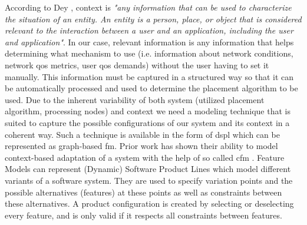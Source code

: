 According to Dey \cite{Dey2001}, context is \textit{"any information that can be used to characterize the situation of an entity. An entity is a person, place, or object that is considered relevant to the interaction between a user and an application, including the user and application"}.
In our case, relevant information is any information that helps determining what mechanism to use (i.e. information about network conditions, network \gls{qos} metrics, user \gls{qos} demands) without the user having to set it manually.
This information must be captured in a structured way so that it can be automatically processed and used to determine the placement algorithm to be used.  
Due to the inherent variability of both system (utilized placement algorithm, processing nodes) and context we need a modeling technique that is suited to capture the possible configurations of our system and its context in a coherent way. 
Such a technique is available in the form of \Gls{dspl} which can be represented as graph-based \gls{fm}. Prior work has shown their ability to model context-based adaptation of a system with the help of so called \Gls{cfm} \cite{Saller2013} \cite{Acher2009}.
Feature Models can represent (Dynamic) Software Product Lines which model different variants of a software system. They are used to specify variation points and the possible alternatives (features) at these points as well as constraints between these alternatives. A product configuration is created by 
 selecting or deselecting every feature, and is only valid if it respects all constraints between features.
 

